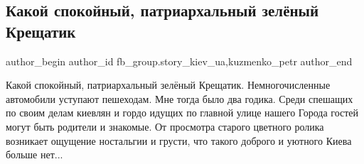  
 
 
 
 
 
\subsection{Какой спокойный, патриархальный зелёный Крещатик}
\label{sec:02_04_2021.fb.fb_group.story_kiev_ua.1.kreschatik}
 
\ifcmt
 author_begin
   author_id fb_group.story_kiev_ua,kuzmenko_petr
 author_end
\fi

Какой спокойный, патриархальный зелёный Крещатик. Немногочисленные автомобили
уступают пешеходам. Мне тогда было два годика. Среди спешащих по своим делам
киевлян и гордо идущих по главной улице нашего Города гостей могут быть
родители и знакомые. От просмотра старого цветного ролика возникает ощущение
ностальгии и грусти, что такого доброго и уютного Киева больше нет...


